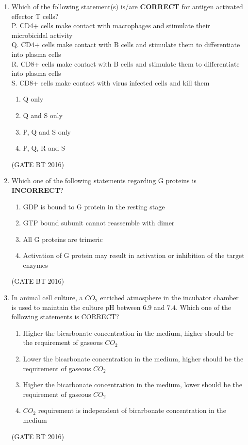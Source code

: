 \documentclass[journal,12pt,onecolumn]{IEEEtran}
\theoremstyle{remark}
\begin{document}
\begin{enumerate}
\item Which of the following statement(s) is/are \textbf{CORRECT} for antigen activated effector T cells?\\
P. CD4+ cells make contact with macrophages and stimulate their microbicidal activity\\
Q. CD4+ cells make contact with B cells and stimulate them to differentiate into plasma cells\\
R. CD8+ cells make contact with B cells and stimulate them to differentiate into plasma cells\\
S. CD8+ cells make contact with virus infected cells and kill them
\begin{multicols}{4}
\begin{enumerate}
\item Q only	
\item Q and S only	
\item P, Q and S only	
\item P, Q, R and S
\end{enumerate}
\end{multicols} \hfill(GATE BT 2016)  

\item Which one of the following statements regarding G proteins is \textbf{INCORRECT}?
\begin{multicols}{2}
\begin{enumerate}
\item GDP is bound to G protein in the resting stage
\item  GTP bound  subunit cannot reassemble with  dimer
\item  All G proteins are trimeric
\item  Activation of G protein may result in activation or inhibition of the target enzymes
\end{enumerate}
\end{multicols} \hfill(GATE BT 2016)  

\item In animal cell culture, a $CO_2$ enriched atmosphere in the incubator chamber is used to maintain the culture pH between $6.9$ and $7.4$. Which one of the following statements is CORRECT?
\begin{enumerate}
 \item Higher the bicarbonate concentration in the medium, higher should be the requirement of gaseous $CO_2$
\item  Lower the bicarbonate concentration in the medium, higher should be the requirement of gaseous $CO_2$
\item  Higher the bicarbonate concentration in the medium, lower should be the requirement of gaseous $CO_2$
\item $CO_2$ requirement is independent of bicarbonate concentration in the medium
\end{enumerate}  \hfill(GATE BT 2016) 


\end{enumerate}
\end{document}
